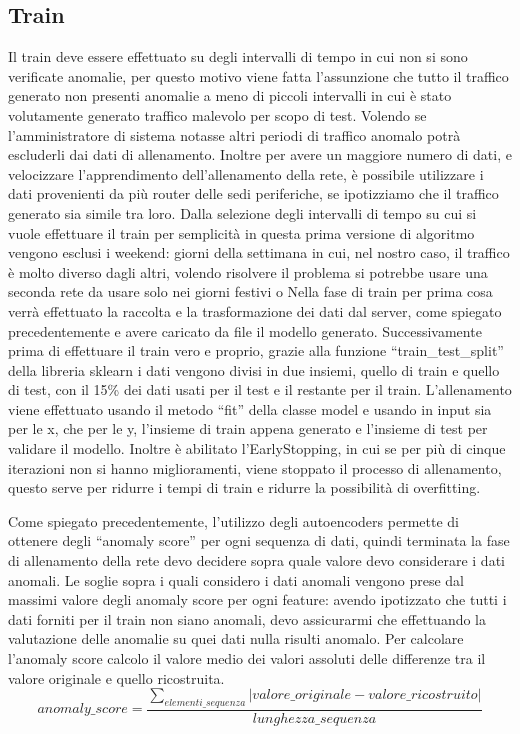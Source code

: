 \subsection{Train}
Il train deve essere effettuato su degli intervalli di tempo in cui non si sono verificate anomalie, per questo motivo viene fatta l'assunzione che tutto il traffico generato non presenti anomalie a meno di piccoli intervalli in cui è stato volutamente generato traffico malevolo per scopo di test. Volendo se l'amministratore di sistema notasse altri periodi di traffico anomalo potrà escluderli dai dati di allenamento.
Inoltre per avere un maggiore numero di dati, e velocizzare l'apprendimento dell'allenamento della rete, è possibile utilizzare i dati provenienti da più router delle sedi periferiche, se ipotizziamo che il traffico generato sia simile tra loro.
Dalla selezione degli intervalli di tempo su cui si vuole effettuare il train per semplicità in questa prima versione di algoritmo vengono esclusi i weekend: giorni della settimana in cui, nel nostro caso, il traffico è molto diverso dagli altri, volendo risolvere il problema si potrebbe usare una seconda rete da usare solo nei giorni festivi o %
Nella fase di train per prima cosa verrà effettuato la raccolta e la trasformazione dei dati dal server, come spiegato precedentemente e avere caricato da file il modello generato.
Successivamente prima di effettuare il train vero e proprio, grazie alla funzione ``train\_test\_split'' della libreria sklearn i dati vengono divisi in due insiemi, quello di train e quello di test, con il 15\% dei dati usati per il test e il restante per il train.
L'allenamento viene effettuato usando il metodo ``fit'' della classe model e usando in input sia per le x, che per le y, l'insieme di train appena generato e l'insieme di test per validare il modello. Inoltre è abilitato l'EarlyStopping, in cui se per più di cinque iterazioni non si hanno miglioramenti, viene stoppato il processo di allenamento, questo serve per ridurre i tempi di train e ridurre la possibilità di overfitting.

Come spiegato precedentemente, l'utilizzo degli autoencoders permette di ottenere degli ``anomaly score'' per ogni sequenza di dati, quindi terminata la fase di allenamento della rete devo decidere sopra quale valore devo considerare i dati anomali.
Le soglie sopra i quali considero i dati anomali vengono prese dal massimi valore degli anomaly score per ogni feature: avendo ipotizzato che tutti i dati forniti per il train non siano anomali, devo assicurarmi che effettuando la valutazione delle anomalie su quei dati nulla risulti anomalo.
Per calcolare l'anomaly score calcolo il valore medio dei valori assoluti delle differenze tra il valore originale e quello ricostruita.
\begin{equation}
    anomaly\_score = \frac{\sum_{elementi\_sequenza}\lvert valore\_originale - valore\_ricostruito \rvert}{lunghezza\_sequenza}
\end{equation}

